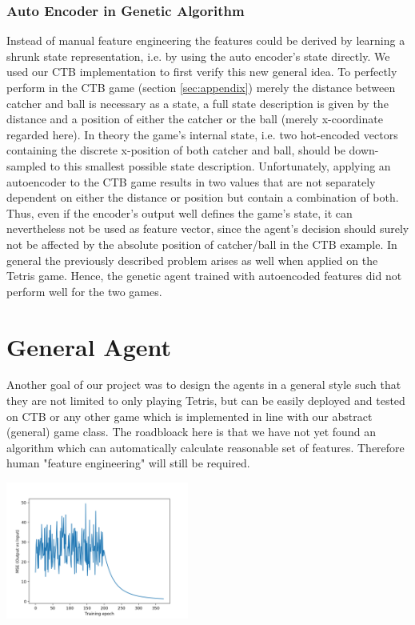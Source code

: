 \subsubsection*{Auto Encoder in Genetic Algorithm}
Instead of manual feature engineering the features could be derived by learning a shrunk state representation, i.e. by using the auto encoder's state directly. We used our CTB implementation to first verify this new general idea. To perfectly perform in the CTB game (section \ref{sec:appendix}) merely the distance between catcher and ball is necessary as a state, a full state description is given by the distance and a position of either the catcher or the ball (merely x-coordinate regarded here). In theory the game's internal state, i.e. two hot-encoded vectors containing the discrete x-position of both catcher and ball, should be down-sampled to this smallest possible state description. Unfortunately, applying an autoencoder to the CTB game results in two values that are not separately dependent on either the distance or position but contain a combination of both. Thus, even if the encoder's output well defines the game's state, it can nevertheless not be used as feature vector, since the agent's decision should surely not be affected by the absolute position of catcher/ball in the CTB example. In general the previously described problem arises as well when applied on the Tetris game. Hence, the genetic agent trained with autoencoded features did not perform well for the two games.

\section{General Agent}
\label{sec:generality}
Another goal of our project was to design the agents in a general style such that they are not limited to only playing Tetris, but can be easily deployed and tested on CTB or any other game which is implemented in line with our abstract (general) game class. The roadbloack here is that we have not yet found an algorithm which can automatically calculate reasonable set of features. Therefore human "feature engineering" will still be required. 

\begin{Figure}
\centering
\includegraphics[width=6cm]{imgs/encoder_errors.png}
\label{fig:encoder_errors}
\end{Figure}

